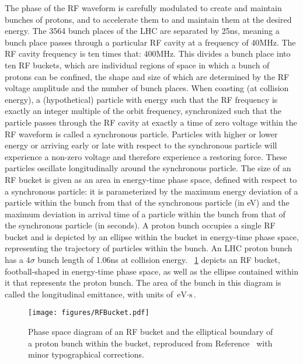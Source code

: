 The phase of the RF waveform is carefully modulated to create and maintain bunches of protons, and to accelerate them to and maintain them at the desired energy.
The 3564 bunch places of the LHC are separated by 25\unit{ns}, meaning a bunch place passes through a particular RF cavity at a frequency of 40\unit{MHz}.
The RF cavity frequency is ten times that: 400\unit{MHz}.
This divides a bunch place into ten RF buckets, which are individual regions of space in which a bunch of protons can be confined, the shape and size of which are determined by the RF voltage amplitude and the number of bunch places.
When coasting (at collision energy), a (hypothetical) particle with energy such that the RF frequency is exactly an integer multiple of the orbit frequency, synchronized such that the particle passes through the RF cavity at exactly a time of zero voltage within the RF waveform is called a synchronous particle.
Particles with higher or lower energy or arriving early or late with respect to the synchronous particle will experience a non-zero voltage and therefore experience a restoring force.
These particles oscillate longitudinally around the synchronous particle.
The size of an RF bucket is given as an area in energy-time phase space, defined with respect to a synchronous particle: it is parameterized by the maximum energy deviation of a particle within the bunch from that of the synchronous particle (in \unit{eV}) and the maximum deviation in arrival time of a particle within the bunch from that of the synchronous particle (in seconds).
A proton bunch occupies a single RF bucket and is depicted by an ellipse within the bucket in energy-time phase space, representing the trajectory of particles within the bunch.
An LHC proton bunch has a 4$\sigma$ bunch length of 1.06\unit{ns} at collision energy.
\Fig~\ref{cms:rfbucket} depicts an RF bucket, football-shaped in energy-time phase space, as well as the ellipse contained within it that represents the proton bunch. The area of the bunch in this diagram is called the longitudinal emittance, with units of $\text{eV}\cdot\text{s}$.

\begin{figure}[tpb]
  \centering
  \texttt{[image: figures/RFBucket.pdf]}
  \caption{Phase space diagram of an RF bucket and the elliptical boundary of a proton bunch within the bucket, reproduced from Reference~\cite{Baird:1017689} with minor typographical corrections.}
  \label{cms:rfbucket}
\end{figure}


